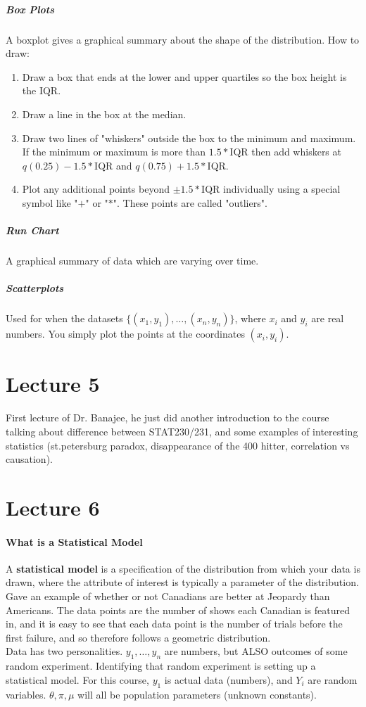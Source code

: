\documentclass[10pt,letter]{article}
\theoremstyle{plain}
\theoremstyle{definition}
\begin{document}
\subparagraph{Box Plots}
A boxplot gives a graphical summary about the shape of the distribution. How to draw:
\begin{enumerate}
    \item Draw a box that ends at the lower and upper quartiles so the box height is the IQR.
    \item Draw a line in the box at the median.
    \item Draw two lines of "whiskers" outside the box to the minimum and maximum. If the minimum or maximum is more than $1.5*$IQR then add whiskers at $q(0.25)-1.5*$IQR and $q(0.75)+1.5*$IQR.
    \item Plot any additional points beyond $\pm1.5*$IQR individually using a special symbol like "$+$" or "$*$". These points are called "outliers". 
\end{enumerate}

\subparagraph{Run Chart}
A graphical summary of data which are varying over time. 

\subparagraph{Scatterplots}
Used for when the datasets $\{(x_1,y_1),\ldots,(x_n,y_n)\}$, where $x_i$ and $y_i$ are real numbers. You simply plot the points at the coordinates $(x_i,y_i)$. 

\section*{Lecture 5}
First lecture of Dr. Banajee, he just did another introduction to the course talking about difference between STAT230/231, and some examples of interesting statistics (st.petersburg paradox, disappearance of the 400 hitter, correlation vs causation).

\section*{Lecture 6}
\paragraph{What is a Statistical Model}
A \textbf{statistical model} is a specification of the distribution from which your data is drawn, where the attribute of interest is typically a parameter of the distribution. Gave an example of whether or not Canadians are better at Jeopardy than Americans. The data points are the number of shows each Canadian is featured in, and it is easy to see that each data point is the number of trials before the first failure, and so therefore follows a geometric distribution. \\ 
Data has two personalities. $y_1,\ldots,y_n$ are numbers, but ALSO outcomes of some random experiment. Identifying that random experiment is setting up a statistical model. For this course, $y_1$ is actual data (numbers), and $Y_i$ are random variables. $\theta,\pi,\mu$ will all be population parameters (unknown constants). 
\end{document}
